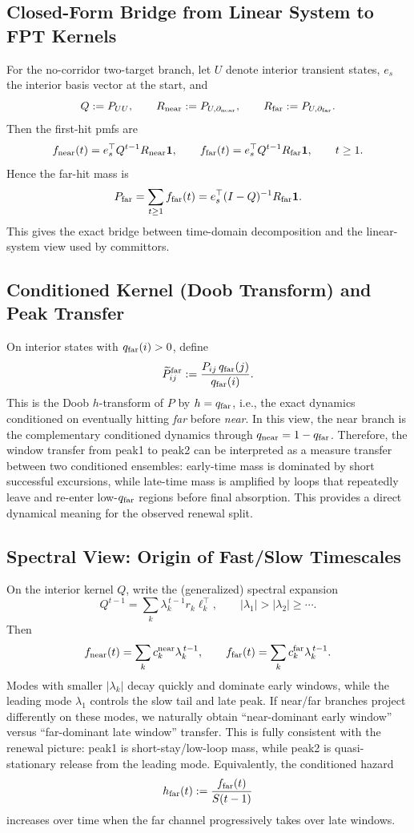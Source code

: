 \documentclass[11pt]{article}
\begin{document}
\subsection*{Closed-Form Bridge from Linear System to FPT Kernels}
For the no-corridor two-target branch, let $U$ denote interior transient states, $e_s$ the interior basis vector at the start, and
\[
Q:=P_{UU},\qquad R_{\rm near}:=P_{U,\partial_{\rm near}},\qquad R_{\rm far}:=P_{U,\partial_{\rm far}}.
\]
Then the first-hit pmfs are
\[
f_{\rm near}(t)=e_s^\top Q^{t-1}R_{\rm near}\mathbf 1,\qquad
f_{\rm far}(t)=e_s^\top Q^{t-1}R_{\rm far}\mathbf 1,\qquad t\ge 1.
\]
Hence the far-hit mass is
\[
P_{\rm far}=\sum_{t\ge 1}f_{\rm far}(t)=e_s^\top(I-Q)^{-1}R_{\rm far}\mathbf 1.
\]
This gives the exact bridge between time-domain decomposition and the linear-system view used by committors.

\subsection*{Conditioned Kernel (Doob Transform) and Peak Transfer}
On interior states with $q_{\rm far}(i)>0$, define
\[
\widetilde P^{\rm far}_{ij}:=\frac{P_{ij}\,q_{\rm far}(j)}{q_{\rm far}(i)}.
\]
This is the Doob $h$-transform of $P$ by $h=q_{\rm far}$, i.e., the exact dynamics conditioned on eventually hitting \emph{far} before \emph{near}. In this view, the near branch is the complementary conditioned dynamics through $q_{\rm near}=1-q_{\rm far}$. Therefore, the window transfer from peak1 to peak2 can be interpreted as a measure transfer between two conditioned ensembles: early-time mass is dominated by short successful excursions, while late-time mass is amplified by loops that repeatedly leave and re-enter low-$q_{\rm far}$ regions before final absorption. This provides a direct dynamical meaning for the observed renewal split.

\subsection*{Spectral View: Origin of Fast/Slow Timescales}
On the interior kernel $Q$, write the (generalized) spectral expansion
\[
Q^{t-1}=\sum_k \lambda_k^{\,t-1} r_k\ell_k^\top,\qquad |\lambda_1|>|\lambda_2|\ge\cdots.
\]
Then
\[
f_{\rm near}(t)=\sum_k c_k^{\rm near}\lambda_k^{\,t-1},\qquad
f_{\rm far}(t)=\sum_k c_k^{\rm far}\lambda_k^{\,t-1}.
\]
Modes with smaller $|\lambda_k|$ decay quickly and dominate early windows, while the leading mode $\lambda_1$ controls the slow tail and late peak. If near/far branches project differently on these modes, we naturally obtain ``near-dominant early window'' versus ``far-dominant late window'' transfer. This is fully consistent with the renewal picture: peak1 is short-stay/low-loop mass, while peak2 is quasi-stationary release from the leading mode. Equivalently, the conditioned hazard
\[
h_{\rm far}(t):=\frac{f_{\rm far}(t)}{S(t-1)}
\]
increases over time when the far channel progressively takes over late windows.
\end{document}
